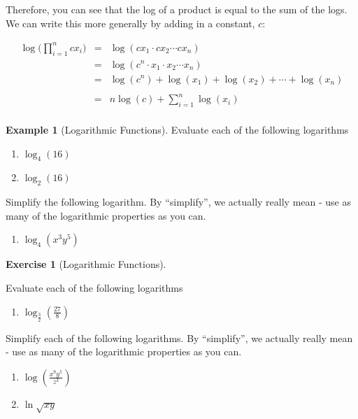 \documentclass[
]{book}
\providecommand{\tightlist}{%
  \setlength{\itemsep}{0pt}\setlength{\parskip}{0pt}}
\theoremstyle{definition}
\theoremstyle{definition}
\newtheorem{example}{Example}[chapter]
\theoremstyle{definition}
\newtheorem{exercise}{Exercise}[chapter]
\theoremstyle{remark}
\begin{document}
Therefore, you can see that the log of a product is equal to the sum of the logs. We can write this more generally by adding in a constant, \(c\):

\begin{eqnarray*}
            \log \bigg(\prod\limits_{i=1}^n c x_i\bigg) &=& \log(cx_1 \cdot cx_2 \cdots cx_n)\\
            &=& \log(c^n \cdot x_1 \cdot x_2 \cdots x_n)\\
            &=& \log(c^n) + \log(x_1) + \log(x_2) + \cdots + \log(x_n)\\\\
            &=& n \log(c) +  \sum\limits_{i=1}^n \log (x_i)\\
\end{eqnarray*}

\begin{example}[Logarithmic Functions]
\protect\hypertarget{exm:log}{}{\label{exm:log} {} }
Evaluate each of the following logarithms

\begin{enumerate}
\def\labelenumi{\arabic{enumi}.}
\item
  \(\log_4(16)\)
\item
  \(\log_2(16)\)
\end{enumerate}

Simplify the following logarithm. By ``simplify'', we actually really mean - use as many of the logarithmic properties as you can.

\begin{enumerate}
\def\labelenumi{\arabic{enumi}.}
\setcounter{enumi}{2}
\tightlist
\item
  \(\log_4(x^3y^5)\)
\end{enumerate}
\end{example}

\begin{exercise}[Logarithmic Functions]
\protect\hypertarget{exr:log1}{}{\label{exr:log1} {} }

Evaluate each of the following logarithms

\begin{enumerate}
\def\labelenumi{\arabic{enumi}.}
\tightlist
\item
  \(\log_\frac{3}{2}(\frac{27}{8})\)
\end{enumerate}

Simplify each of the following logarithms. By ``simplify'', we actually really mean - use as many of the logarithmic properties as you can.

\begin{enumerate}
\def\labelenumi{\arabic{enumi}.}
\setcounter{enumi}{1}
\item
  \(\log(\frac{x^9y^5}{z^3})\)
\item
  \(\ln{\sqrt{xy}}\)
\end{enumerate}
\end{exercise}
\end{document}
